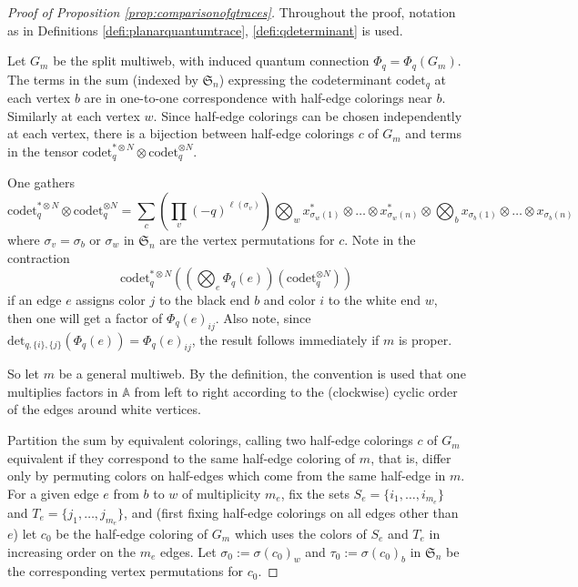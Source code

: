 \documentclass[12pt, reqno]{amsart}
\theoremstyle{definition}
\renewcommand{\det}{\mathrm{det}}%
\begin{document}
\begin{proof}[Proof of Proposition \ref{prop:comparisonofqtraces}] 
Throughout the proof, notation as in Definitions \ref{defi:planarquantumtrace}, \ref{defi:qdeterminant} is used.  

Let $G_m$ be the split multiweb, with induced quantum connection $\Phi_q=\Phi_q(G_m)$.  The terms in the sum (indexed by $\mathfrak{S}_n$) expressing the codeterminant $\mathrm{codet}_q$ at each vertex $b$ are in one-to-one correspondence with half-edge colorings near $b$.  Similarly at each vertex $w$.  Since half-edge colorings can be chosen independently at each vertex, there is a bijection between half-edge colorings $c$ of $G_m$ and terms in the tensor $\mathrm{codet}_q^{*\otimes N}\otimes\mathrm{codet}_q^{\otimes N}$. 

One gathers
$$
\mathrm{codet}_q^{*\otimes N}\otimes\mathrm{codet}_q^{\otimes N}
=\sum_c \left(\prod_v (-q)^{\ell(\sigma_v)}\right)
\bigotimes_w x^*_{\sigma_w(1)}\otimes\dots\otimes x^*_{\sigma_w(n)} \otimes\bigotimes_b x_{\sigma_b(1)}\otimes\dots\otimes x_{\sigma_b(n)}
$$
where $\sigma_v=\sigma_b$ or $\sigma_w$ in $\mathfrak{S}_n$ are the vertex permutations for $c$.  Note in the contraction 
$$
\mathrm{codet}_q^{*\otimes N}\left(\left(\bigotimes_e\Phi_q(e)\right)(\mathrm{codet}_q^{\otimes N})\right)
$$ 
if an edge $e$ assigns color $j$ to the black end $b$ and color $i$ to the white end $w$, then one will get a factor of $\Phi_q(e)_{ij}$.  Also note, since $\det_{q,\{i\},\{j\}}(\Phi_q(e))=\Phi_q(e)_{ij}$, the result follows immediately if $m$ is proper.  

So let $m$ be a general multiweb.  By the definition, the convention is used that one multiplies factors in $\mathbb{A}$ from left to right according to the (clockwise) cyclic order of the edges around white vertices.  

Partition the sum by equivalent colorings, calling two half-edge colorings $c$ of  $G_m$ equivalent if they correspond to the same half-edge coloring of $m$, that is, differ only by permuting colors on half-edges which come from the same half-edge in $m$. For a given edge $e$ from $b$ to $w$ of multiplicity $m_e$, fix the sets $S_e = \{i_1,\dots,i_{m_e}\}$ and $T_e=\{j_1,\dots,j_{m_e}\}$,  and (first fixing half-edge colorings on all edges other than $e$) let $c_0$ be the half-edge coloring of $G_m$ which uses the colors of $S_e$ and $T_e$ in increasing order on the $m_e$ edges.  Let $\sigma_{0}:=\sigma(c_0)_w$ and $\tau_{0}:=\sigma(c_0)_b$ in $\mathfrak{S}_n$ be the corresponding vertex permutations for $c_0$.  


\end{proof}
\end{document}
